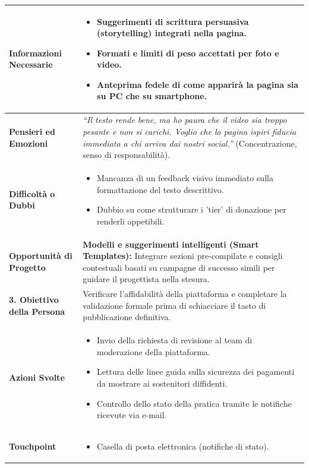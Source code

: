 \documentclass[11pt,a4paper]{article}
\begin{document}
\begin{table}[h!]
\begin{tabular}{|p{3.2cm}|p{11.8cm}|}
\textbf{Informazioni Necessarie} &
\begin{itemize}[leftmargin=*,nosep]
    \item Suggerimenti di scrittura persuasiva (storytelling) integrati nella pagina.
    \item Formati e limiti di peso accettati per foto e video.
    \item Anteprima fedele di come apparirà la pagina sia su PC che su smartphone.
\end{itemize} \\ \hline
\textbf{Pensieri ed Emozioni} &
\textit{``Il testo rende bene, ma ho paura che il video sia troppo pesante e non si carichi. Voglio che la pagina ispiri fiducia immediata a chi arriva dai nostri social.''} (Concentrazione, senso di responsabilità). \\ \hline
\textbf{Difficoltà o Dubbi} &
\begin{itemize}[leftmargin=*,nosep]
    \item Mancanza di un feedback visivo immediato sulla formattazione del testo descrittivo.
    \item Dubbio su come strutturare i 'tier' di donazione per renderli appetibili.
\end{itemize} \\ \hline
\textbf{Opportunità di Progetto} &
\textbf{Modelli e suggerimenti intelligenti (Smart Templates):} Integrare sezioni pre-compilate e consigli contestuali basati su campagne di successo simili per guidare il progettista nella stesura. \\ \hline
\hline
\textbf{3. Obiettivo della Persona} & Verificare l'affidabilità della piattaforma e completare la validazione formale prima di schiacciare il tasto di pubblicazione definitiva. \\ \hline
\textbf{Azioni Svolte} &
\begin{itemize}[leftmargin=*,nosep]
    \item Invio della richiesta di revisione al team di moderazione della piattaforma.
    \item Lettura delle linee guida sulla sicurezza dei pagamenti da mostrare ai sostenitori diffidenti.
    \item Controllo dello stato della pratica tramite le notifiche ricevute via e-mail.
\end{itemize} \\ \hline
\textbf{Touchpoint} &
\begin{itemize}[leftmargin=*,nosep]
    \item Casella di posta elettronica (notifiche di stato).

\end{itemize}
\end{tabular}
\end{table}
\end{document}
